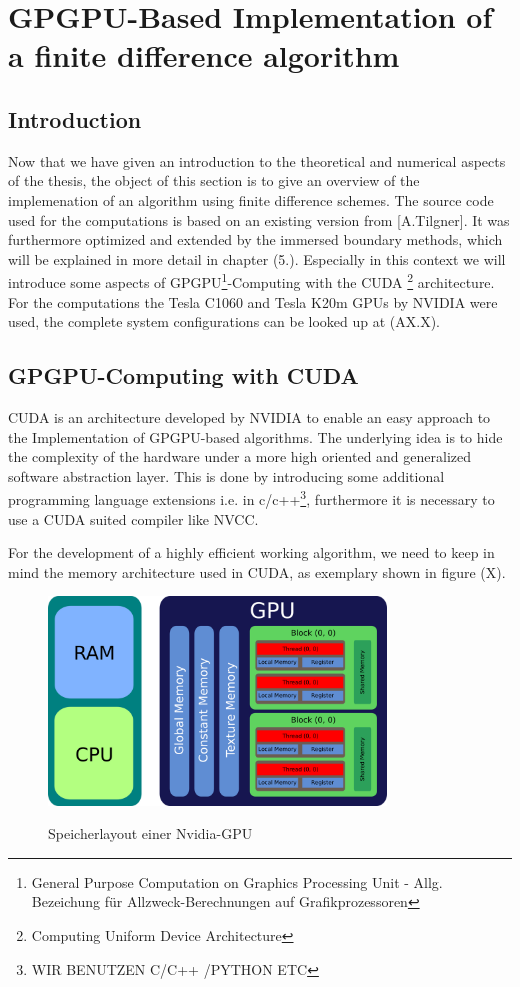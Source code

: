 \chapter{GPGPU-Based Implementation of a finite difference algorithm}

\section{Introduction}

Now that we have given an introduction to the theoretical and numerical aspects of the thesis,
the object of this section is to give an overview of the implemenation of an algorithm using finite difference schemes.
The source code used for the computations is based on an existing version from [A.Tilgner].
It was furthermore optimized  and extended by the immersed boundary methods, which will be explained in more detail in chapter (5.).
Especially in this context we will introduce some aspects of GPGPU\footnote{General Purpose Computation on Graphics Processing Unit - Allg.  Bezeichung für Allzweck-Berechnungen auf Grafikprozessoren}-Computing
with the CUDA \footnote{Computing Uniform Device Architecture} architecture.
For the computations the  Tesla C1060 and Tesla K20m GPUs by NVIDIA were used, the complete system configurations can be looked up at (AX.X).

\section{GPGPU-Computing with CUDA}

CUDA is an architecture developed by NVIDIA to enable an easy approach to the Implementation of GPGPU-based algorithms.
The underlying idea is to hide the complexity of the hardware under a more high oriented and generalized software abstraction layer.
This is done by introducing some additional programming language extensions i.e. in c/c++\footnote{WIR BENUTZEN C/C++ /PYTHON ETC},
furthermore it is necessary to use a CUDA suited compiler like NVCC.

For the development of a highly efficient working algorithm, we need to keep in mind the memory architecture used in CUDA, as
exemplary shown in figure (X).

\begin{figure}[!tbp]
  \centering
  \includegraphics[width=0.8\textwidth]{gfx/cuda/gpu.png}\label{fig:gpu_arch}
  \caption{Speicherlayout einer Nvidia-GPU}
\end{figure}

